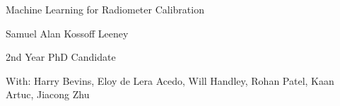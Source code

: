 \documentclass[aspectratio=169]{beamer}
\begin{document}
\begin{frame}
	\begin{center}
		{\huge Machine Learning for Radiometer Calibration\par}
		\vspace{0.5cm}


		{\large Samuel Alan Kossoff Leeney\par}

		{\small 2nd Year PhD Candidate\par}
		\vspace{0.5cm}


		{\footnotesize With: Harry Bevins, Eloy de Lera Acedo, Will Handley, Rohan Patel, Kaan Artuc, Jiacong Zhu \par}

		\vfill

		


	\end{center}
	\vfill
\end{frame}
% 		

% 		
\end{document}
